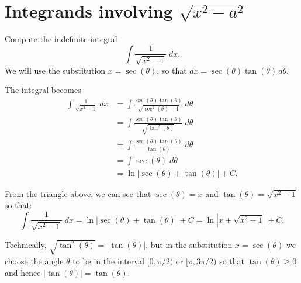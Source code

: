 \documentclass{ximera}
\begin{document}
\section{Integrands involving $\sqrt{x^2 - a^2}$}

\begin{example}
Compute the indefinite integral
\[
\int \frac{1}{\sqrt{x^2-1}} \; dx.
\]
We will use the substitution $x = \sec(\theta)$,
so that $dx = \sec(\theta)\tan(\theta) \, d\theta$.

The integral becomes
\begin{align*}
\int \frac{1}{\sqrt{x^2-1}}\; dx &= \int \frac{\sec(\theta)\tan(\theta)}{\sqrt{\sec^2(\theta)-1}}\; d\theta\\
                                 &= \int \frac{\sec(\theta)\tan(\theta)}{\sqrt{\tan^2(\theta)}}\; d\theta\\
                                 &= \int \frac{\sec(\theta)\tan(\theta)}{\tan(\theta)}\; d\theta\\
                                  &= \int \sec(\theta)\; d\theta\\
                                  &= \ln|\sec(\theta)+ \tan(\theta)| + C.
\end{align*}


From the triangle above, we can see that $\sec(\theta) = x$ and $\tan(\theta) = \sqrt{x^2-1}$ so that:
\[
\int \frac{1}{\sqrt{x^2-1}} \; dx = \ln|\sec(\theta)+ \tan(\theta)| + C = \ln|x+\sqrt{x^2-1}| + C.
\]

\end{example}

\begin{remark}
Technically, $\sqrt{\tan^2(\theta)} = |\tan(\theta)|$, but in the substitution $x = \sec(\theta)$ we 
choose the angle $\theta$ to be in the interval 
$[0, \pi/2)$ or $[\pi, 3\pi/2)$ so that $\tan(\theta) \geq 0$ and hence $|\tan(\theta)| = \tan(\theta)$.
\end{remark}
\end{document}
